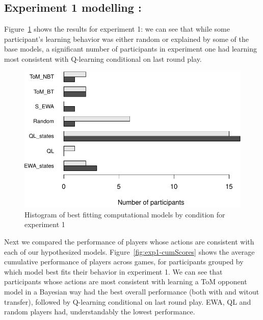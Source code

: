 \documentclass[man,floatsintext]{apa6}
\begin{document}
\hypertarget{experiment-1-modelling}{%
\subsection{Experiment 1 modelling :}\label{experiment-1-modelling}}

Figure~\ref{fig:exp1-comp-models} shows the results for experiment 1: we can see that while some participant's learning behavior was either random or explained by some of the base models, a significant number of participants in experiment one had learning most consistent with Q-learning conditional on last round play.

\begin{figure}

{\centering \includegraphics{draft_report_v1_files/figure-latex/exp1-comp-models-1} 

}

\caption{Histogram of best fitting computational models by condition for experiment 1}\label{fig:exp1-comp-models}
\end{figure}

Next we compared the performance of players whose actions are consistent with each of our hypothesized models. Figure~\ref{fig:exp1-cumScores} shows the average cumulative performance of players across games, for participants grouped by which model best fits their behavior in experiment 1. We can see that participants whose actions are most consistent with learning a ToM opponent model in a Bayesian way had the best overall performance (both with and witout transfer), followed by Q-learning conditional on last round play. EWA, QL and random players had, understandably the lowest performance.
\end{document}

